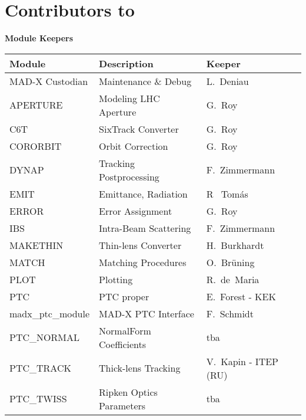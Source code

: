\chapter{Contributors to \madx}
\label{chap:contributors}

\begin{center} 
\textbf{\madx Module Keepers} 
\end{center}

%
\begin{table}[H]
  \begin{center}
    \vspace*{1mm}
    \footnotesize
    \begin{tabular}{|l|l|l|}
      \hline
      \textbf{Module}    &\textbf{Description}        &\textbf{Keeper} \\\hline
      MAD-X Custodian    &Maintenance \& Debug        &L.~Deniau \\\hline
      APERTURE           &Modeling LHC Aperture       &G.~Roy \\\hline
      C6T                &SixTrack Converter          &G.~Roy \\\hline
      CORORBIT           &Orbit Correction            &G.~Roy \\\hline
      DYNAP              &Tracking Postprocessing     &F.~Zimmermann \\\hline 
      EMIT               &Emittance, Radiation        &R ~Tom\'as \\\hline  
      ERROR              &Error Assignment            &G.~Roy \\\hline
      IBS                &Intra-Beam Scattering       &F.~Zimmermann \\\hline
      MAKETHIN           &Thin-lens Converter         &H.~Burkhardt \\\hline
      MATCH              &Matching Procedures         &O.~Br\"uning \\\hline
      PLOT               &Plotting                    &R.~de~Maria \\\hline
      PTC                &PTC proper                  &E.~Forest - KEK \\\hline
      madx\_ptc\_module    &MAD-X PTC Interface       &F.~Schmidt \\\hline
      PTC\_NORMAL        &NormalForm Coefficients     &tba \\\hline
      PTC\_TRACK         &Thick-lens Tracking         &V.~Kapin - ITEP (RU) \\\hline
      PTC\_TWISS         &Ripken Optics Parameters    &tba \\\hline

\end{tabular}
\end{center}
\end{table}
